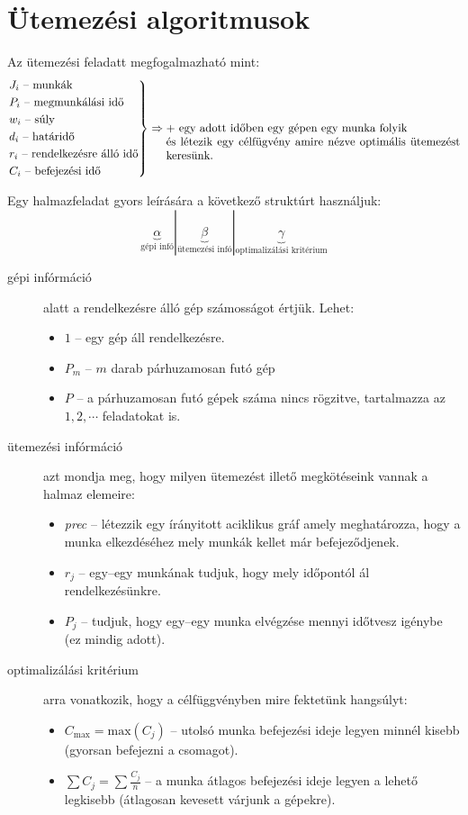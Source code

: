 \newpage
\section{Ütemezési algoritmusok}

Az ütemezési feladatt megfogalmazható mint:
\[
\begin{rcases}
J_i \mbox{ -- munkák} \\
P_i \mbox{ -- megmunkálási idő} \\
w_i \mbox{ -- súly} \\
d_i \mbox{ -- határidő} \\
r_i \mbox{ -- rendelkezésre álló idő} \\
C_i \mbox{ -- befejezési idő} \\
\end{rcases}
\Rightarrow 
\parbox[t]{9cm}{ $+$ egy adott időben egy gépen egy munka folyik \\
és létezik egy célfügvény amire nézve optimális ütemezést keresünk.}
\]

Egy halmazfeladat gyors leírására a következő struktúrt használjuk:
\[
\underbrace{\alpha}_{\mbox{gépi infó}} | \underbrace{\beta}_{\mbox{ütemezési infó}
} | \underbrace{\gamma}_{\mbox{optimalizálási kritérium}}
\]

\begin{description}
  \item[gépi infórmáció] alatt a rendelkezésre álló gép számosságot értjük. Lehet:
  \begin{itemize}
  \item $1$ -- egy gép áll rendelkezésre.
  \item $P_m$ -- $m$ darab párhuzamosan futó gép
  \item $P$ -- a párhuzamosan futó gépek száma nincs rögzitve, tartalmazza az $1,2,\cdots$ feladatokat is.
\end{itemize}
  \item[ütemezési infórmáció] azt mondja meg, hogy milyen ütemezést illető
  megkötéseink vannak a halmaz elemeire:
  \begin{itemize}
  \item \emph{prec} -- létezzik egy írányitott aciklikus gráf amely
  meghatározza, hogy a munka elkezdéséhez mely munkák kellet már befejeződjenek.
  \item $r_j$ -- egy--egy munkának tudjuk, hogy mely időpontól ál rendelkezésünkre.
  \item $P_j$ -- tudjuk, hogy egy--egy munka elvégzése mennyi időtvesz igénybe
  (ez mindig adott).
\end{itemize}
  \item[optimalizálási kritérium] arra vonatkozik, hogy a célfüggvényben mire
  fektetünk hangsúlyt:
  \begin{itemize}
  \item $C_{\mbox{max}}=\mbox{max}(C_j)$ -- utolsó munka befejezési ideje legyen minnél
  kisebb (gyorsan befejezni a csomagot).
  \item $\sum C_j = \sum \frac{C_j}{n}$ -- a munka átlagos befejezési ideje
  legyen a lehető legkisebb (átlagosan kevesett várjunk a gépekre).
\end{itemize}
\end{description} 

